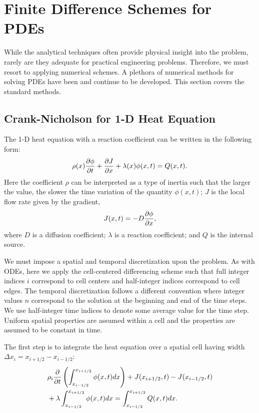 \section{Finite Difference Schemes for PDEs}

While the analytical techniques often provide physical insight into the problem, rarely are they adequate for practical engineering problems. Therefore, we must resort to applying numerical schemes. A plethora of numerical methods for solving PDEs have been and continue to be developed. This section covers the standard methods.

\subsection{Crank-Nicholson for 1-D Heat Equation}

The 1-D heat equation with a reaction coefficient can be written in the following form:
\begin{align}
  \rho(x) \frac{ \partial {\phi} }{ \partial {t} } + \frac{ \partial {J} }{ \partial {x} } + \lambda(x) \phi(x,t) = Q(x,t) .
\end{align}
Here the coefficient $\rho$ can be interpreted as a type of inertia such that the larger the value, the slower the time variation of the quantity $\phi(x,t)$; $J$ is the local flow rate given by the gradient,
\begin{align}
  J(x,t) = -D \frac{ \partial {\phi} }{ \partial {x} } ,
\end{align}
where $D$ is a diffusion coefficient; $\lambda$ is a reaction coefficient; and $Q$ is the internal source.

We must impose a spatial and temporal discretization upon the problem. As with ODEs, here we apply the cell-centered differencing scheme such that full integer indices $i$ correspond to cell centers and half-integer indices correspond to cell edges. The temporal discretization follows a different convention where integer values $n$ correspond to the solution at the beginning and end of the time steps. We use half-integer time indices to denote some average value for the time step. Uniform spatial properties are assumed within a cell and the properties are assumed to be constant in time.

The first step is to integrate the heat equation over a spatial cell having width $\Delta x_i = x_{i+1/2} - x_{i-1/2}$:
\begin{align}
  &\rho_i \frac{ \partial {} }{ \partial {t} } \left( \int_{x_{i-1/2}}^{x_{i+1/2}} \phi(x,t) dx \right)  + J(x_{i+1/2},t) - J(x_{i-1/2},t) \nonumber \\*
  &+ \lambda \int_{x_{i-1/2}}^{x_{i+1/2}} \phi(x,t) dx = \int_{x_{i-1/2}}^{x_{i+1/2}} Q(x,t) dx .
\end{align}

